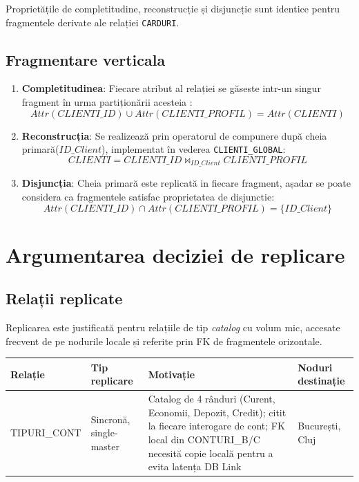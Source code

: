 \documentclass[12pt,a4paper]{article}
\begin{document}
Proprietățile de completitudine, reconstrucție și disjuncție sunt identice pentru fragmentele derivate ale relației \texttt{CARDURI}.


\subsection{Fragmentare verticala}

\begin{enumerate}
  \item \textbf{Completitudinea}: Fiecare atribut al relației se găseste intr-un singur fragment în urma partiționării acesteia :
  \[ Attr(CLIENTI\_ID) \cup Attr(CLIENTI\_PROFIL) = Attr(CLIENTI) \]
  \item \textbf{Reconstrucția}: Se realizează prin operatorul de compunere după cheia primară($ID\_Client$), implementat în vederea \texttt{CLIENTI\_GLOBAL}:
  \[ CLIENTI = CLIENTI\_ID \bowtie_{ID\_Client} CLIENTI\_PROFIL \]
  \item \textbf{Disjuncția}: Cheia primară este replicată in fiecare fragment, așadar se poate considera ca fragmentele satisfac proprietatea de disjunctie:
  \[ Attr(CLIENTI\_ID) \cap Attr(CLIENTI\_PROFIL) = \{ID\_Client\} \]
\end{enumerate}
\section{Argumentarea deciziei de replicare}

\subsection{Relații replicate}

Replicarea este justificată pentru relațiile de tip \textit{catalog} cu volum mic,
accesate frecvent de pe nodurile locale și referite prin FK de fragmentele orizontale.

\begin{center}
{\small
\begin{tabular}{p{2.6cm}p{2.8cm}p{5.4cm}p{2.6cm}}
\toprule
\textbf{Relație} & \textbf{Tip replicare} & \textbf{Motivație} & \textbf{Noduri destinație} \\
\midrule
TIPURI\_CONT & Sincronă, single-master & Catalog de 4 rânduri (Curent, Economii, Depozit, Credit);
  citit la fiecare interogare de cont;
  FK local din CONTURI\_B/C necesită copie locală pentru a evita latența DB Link &
  București, Cluj \\
\bottomrule
\end{tabular}
}
\end{center}
\end{document}
